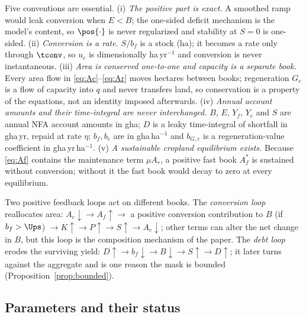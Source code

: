 Five conventions are essential. (i) \emph{The positive part is exact.} A smoothed ramp would leak conversion when $E<B$; the one-sided deficit mechanism is the model's content, so $\pos{\cdot}$ is never regularized and stability at $S=0$ is one-sided. (ii) \emph{Conversion is a rate.} $S/b_f$ is a stock (ha); it becomes a rate only through $\tconv$, so $u_c$ is dimensionally ha\,yr$^{-1}$ and conversion is never instantaneous. (iii) \emph{Area is conserved one-to-one and capacity is a separate book.} Every area flow in \eqref{eq:Ac}--\eqref{eq:Ar} moves hectares between books; regeneration $G_c$ is a flow of capacity into $q$ and never transfers land, so conservation is a property of the equations, not an identity imposed afterwards. (iv) \emph{Annual account amounts and their time-integral are never interchanged.} $B$, $E$, $Y_f$, $Y_c$ and $S$ are annual NFA account amounts in gha; $D$ is a leaky time-integral of shortfall in gha\,yr, repaid at rate $\eta$; $b_f,b_c$ are in gha\,ha$^{-1}$ and $b_{G,c}$ is a regeneration-value coefficient in gha\,yr\,ha$^{-1}$. (v) \emph{A sustainable cropland equilibrium exists.} Because \eqref{eq:Af} contains the maintenance term $\mu A_r$, a positive fast book $A_f^*$ is sustained without conversion; without it the fast book would decay to zero at every equilibrium.

Two positive feedback loops act on different books. The \emph{conversion loop} reallocates area: $A_c\downarrow\to A_f\uparrow\to$ a positive conversion contribution to $B$ (if $b_f>\Ups$) $\to K\uparrow\to P\uparrow\to S\uparrow\to A_c\downarrow$; other terms can alter the net change in $B$, but this loop is the composition mechanism of the paper. The \emph{debt loop} erodes the surviving yield: $D\uparrow\to b_f\downarrow\to B\downarrow\to S\uparrow\to D\uparrow$; it later turns against the aggregate and is one reason the mask is bounded (Proposition~\ref{prop:bounded}).

\subsection{Parameters and their status}\label{sec:params}

